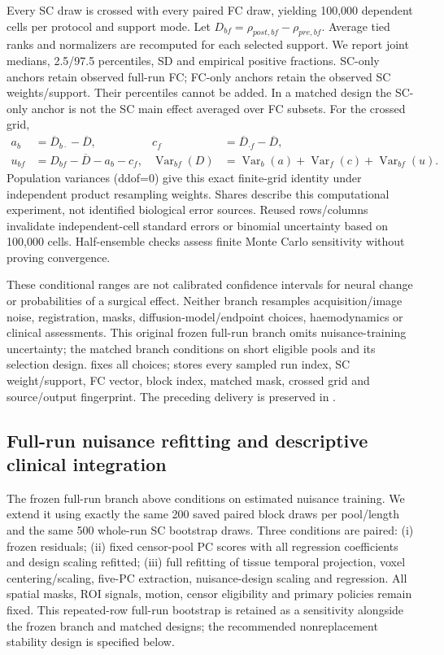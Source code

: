 \documentclass[11pt,a4paper]{article}
\begin{document}
Every SC draw is crossed with every paired FC draw, yielding 100,000 dependent cells per protocol and support mode. Let $D_{bf}=\rho_{post,bf}-\rho_{pre,bf}$. Average tied ranks and normalizers are recomputed for each selected support. We report joint medians, 2.5/97.5 percentiles, SD and empirical positive fractions. SC-only anchors retain observed full-run FC; FC-only anchors retain the observed SC weights/support. Their percentiles cannot be added. In a matched design the SC-only anchor is not the SC main effect averaged over FC subsets. For the crossed grid,
\begin{equation}
\begin{aligned}
 a_b&=\overline D_{b\cdot}-\overline D,&
 c_f&=\overline D_{\cdot f}-\overline D,\\
 u_{bf}&=D_{bf}-\overline D-a_b-c_f,&
 \operatorname{Var}_{bf}(D)&=\operatorname{Var}_b(a)+\operatorname{Var}_f(c)+\operatorname{Var}_{bf}(u).
\end{aligned}
\end{equation}
Population variances (ddof=0) give this exact finite-grid identity under independent product resampling weights. Shares describe this computational experiment, not identified biological error sources. Reused rows/columns invalidate independent-cell standard errors or binomial uncertainty based on 100,000 cells. Half-ensemble checks assess finite Monte Carlo sensitivity without proving convergence.

These conditional ranges are not calibrated confidence intervals for neural change or probabilities of a surgical effect. Neither branch resamples acquisition/image noise, registration, masks, diffusion-model/endpoint choices, haemodynamics or clinical assessments. This original frozen full-run branch omits nuisance-training uncertainty; the matched branch conditions on short eligible pools and its selection design.  fixes all choices;  stores every sampled run index, SC weight/support, FC vector, block index, matched mask, crossed grid and source/output fingerprint. The preceding delivery is preserved in .

\subsection{Full-run nuisance refitting and descriptive clinical integration}\label{sec:refitmethods}
The frozen full-run branch above conditions on estimated nuisance training. We extend it using exactly the same 200 saved paired block draws per pool/length and the same 500 whole-run SC bootstrap draws. Three conditions are paired: (i) frozen residuals; (ii) fixed censor-pool PC scores with all regression coefficients and design scaling refitted; (iii) full refitting of tissue temporal projection, voxel centering/scaling, five-PC extraction, nuisance-design scaling and regression. All spatial masks, ROI signals, motion, censor eligibility and primary policies remain fixed. This repeated-row full-run bootstrap is retained as a sensitivity alongside the frozen branch and matched designs; the recommended nonreplacement stability design is specified below.
\end{document}
